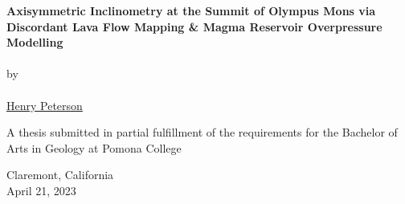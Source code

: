 \begin{titlepage}
    \begin{center}

        \phantom{.}

        \vfill
 
        \large\textbf{Axisymmetric Inclinometry at the Summit of Olympus Mons via Discordant Lava Flow Mapping \& Magma Reservoir Overpressure Modelling}
        \\~\\
        by
        \\~\\
        \href{mailto:hgpa2018@mymail.pomona.edu}{Henry Peterson}

        \vfill
        \vfill
        \vfill

        A thesis submitted in partial fulfillment of the requirements for the Bachelor of Arts in Geology at Pomona College

             
        \vfill
        \vfill
        \vfill

        Claremont, California\\
        April 21, 2023

    \end{center}
 \end{titlepage}